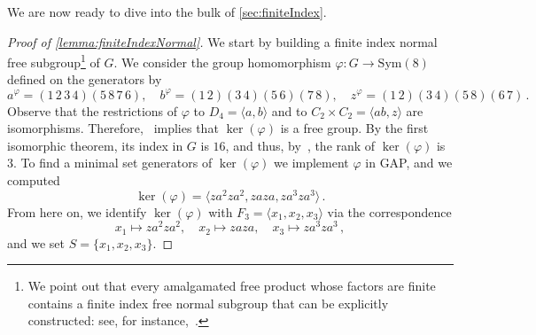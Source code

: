 \documentclass[a4paper]{amsart}
\newcommand{\0}{\mathbf{0}}
\theoremstyle{definition}
\begin{document}
We are now ready to dive into the bulk of \cref{sec:finiteIndex}.
\begin{proof}[Proof of \cref{lemma:finiteIndexNormal}]
    We start by building a finite index normal free subgroup\footnote{We point out that every amalgamated free product whose factors are finite contains a finite index free normal subgroup that can be explicitly constructed: see, for instance,~\cite[Theorem~I.7.4, Proposition~I.7.10, Theorem~IV.1.6 and Corollary~IV.1.9]{DicksDunwoodyGroups}.} of $G$.  We consider the group homomorphism $\varphi: G \to \mathrm{Sym}(8)$
    defined on the generators by
    \[ a^\varphi = (1 \,2 \, 3 \, 4)(5 \,8 \,7 \,6), \quad b^\varphi = (1\,2)(3\,4)(5\,6)(7\,8), \quad z^\varphi = (1\,2)(3\,4)(5\,8)(6\,7) \,.\]
    Observe that the restrictions of $\varphi$ to $D_4 = \langle a,b\rangle$ and to $C_2\times C_2 = \langle ab, z\rangle$ are isomorphisms. Therefore,~\cite[Proposition~I.7.10]{DicksDunwoodyGroups} implies that $\ker(\varphi)$ is a free group. By the first isomorphic theorem, its index in $G$ is $16$, and thus, by~\cite[Remark~IV.1.11]{DicksDunwoodyGroups}, the rank of $\ker(\varphi)$ is $3$. To find a minimal set generators of $\ker(\varphi)$ we implement $\varphi$ in \textsf{GAP}, and we computed
    \[ \ker(\varphi) = \langle  za^2za^2, zaza, za^3za^3 \rangle \,.\]
    From here on, we identify $\ker(\varphi)$ with $F_3 = \langle x_1,x_2,x_3 \rangle$ via the correspondence
    \[ x_1 \mapsto za^2za^2, \quad x_2 \mapsto zaza, \quad x_3 \mapsto za^3za^3 \,, \]
    and we set $S = \{x_1,x_2,x_3\}$.
    

\end{proof}
\end{document}
